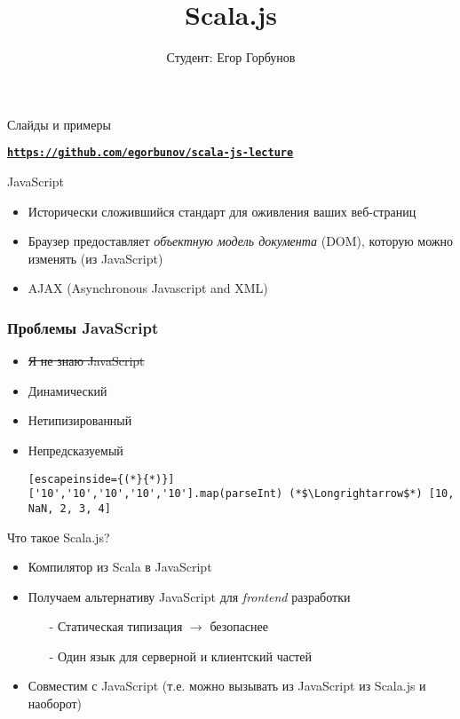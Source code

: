 
\makeatletter
{}
\makeatother
\graphicspath{{./fig/}}

\title{Scala.js}
\author[Егор Горбунов]{
	Студент: Егор Горбунов
}


\maketitle
\begin{frame}{Слайды и примеры}
\begin{center}
	\textbf{\texttt{\href{https://github.com/egorbunov/scala-js-lecture}{https://github.com/egorbunov/scala-js-lecture}}}
\end{center}
\end{frame}

\begin{frame}{JavaScript}

\begin{itemize}
	\item Исторически сложившийся стандарт для оживления ваших веб-страниц
	\item Браузер предоставляет \emph{объектную модель документа} (DOM), которую можно изменять (из JavaScript)
	\item AJAX (Asynchronous Javascript and XML)
\end{itemize}

\end{frame}

\begin{frame}[fragile]
\frametitle{Проблемы JavaScript}
\begin{itemize}
	\item \sout{Я не знаю JavaScript}
	\item Динамический
	\item Нетипизированный
	\item Непредсказуемый
\begin{lstlisting}[escapeinside={(*}{*)}]
['10','10','10','10','10'].map(parseInt) (*$\Longrightarrow$*) [10, NaN, 2, 3, 4]
\end{lstlisting}
\end{itemize}
\end{frame}

\begin{frame}{Что такое Scala.js?}
\begin{itemize}
	\item Компилятор из \alert{Scala} в \alert{JavaScript}
	\item Получаем альтернативу JavaScript для \emph{frontend} разработки
		\begin{itemize}
			\item[-] Статическая типизация $\rightarrow$ безопаснее
			\item[-] Один язык для серверной и клиентский частей
		\end{itemize}
	\item Совместим с JavaScript (т.е. можно вызывать из JavaScript из Scala.js и наоборот)
\end{itemize}
\end{frame}

